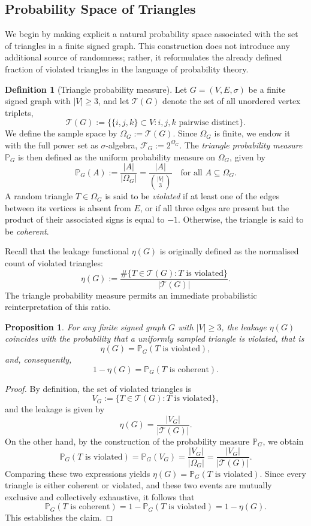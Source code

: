 \documentclass[11pt,a4paper]{article}
\newtheorem{proposition}[theorem]{Proposition}
\theoremstyle{definition}
\newtheorem{definition}[theorem]{Definition}
\newcommand{\Ttri}{\mathcal{T}} %
\newcommand{\Prob}{\mathbb{P}}
\begin{document}
\subsection{Probability Space of Triangles}

We begin by making explicit a natural probability space associated with the set of triangles in a finite signed graph. This construction does not introduce any additional source of randomness; rather, it reformulates the already defined fraction of violated triangles in the language of probability theory.

\begin{definition}[Triangle probability measure]
Let \(G = (V,E,\sigma)\) be a finite signed graph with \(|V| \geq 3\), and let \(\Ttri(G)\) denote the set of all unordered vertex triplets,
\[
 \Ttri(G) := \{ \{i,j,k\} \subset V : i,j,k \text{ pairwise distinct} \}.
\]
We define the sample space by \(\Omega_G := \Ttri(G)\). Since \(\Omega_G\) is finite, we endow it with the full power set as \(\sigma\)-algebra, \(\mathscr{F}_G := 2^{\Omega_G}\). The \emph{triangle probability measure} \(\Prob_G\) is then defined as the uniform probability measure on \(\Omega_G\), given by
\[
 \Prob_G(A) := \frac{|A|}{|\Omega_G|} = \frac{|A|}{\binom{|V|}{3}} \quad \text{for all } A \subseteq \Omega_G.
\]
A random triangle \(T \in \Omega_G\) is said to be \emph{violated} if at least one of the edges between its vertices is absent from \(E\), or if all three edges are present but the product of their associated signs is equal to \(-1\). Otherwise, the triangle is said to be \emph{coherent}.
\end{definition}

Recall that the leakage functional \(\eta(G)\) is originally defined as the normalised count of violated triangles:
\[
 \eta(G) := \frac{\#\{ T \in \Ttri(G) : T \text{ is violated}\}}{|\Ttri(G)|}.
\]
The triangle probability measure permits an immediate probabilistic reinterpretation of this ratio.

\begin{proposition}
For any finite signed graph \(G\) with \(|V| \geq 3\), the leakage \(\eta(G)\) coincides with the probability that a uniformly sampled triangle is violated, that is
\[
 \eta(G) = \Prob_G(T \text{ is violated}),
\]
and, consequently,
\[
 1 - \eta(G) = \Prob_G(T \text{ is coherent}).
\]
\end{proposition}

\begin{proof}
By definition, the set of violated triangles is
\[
 V_G := \{ T \in \Ttri(G) : T \text{ is violated} \},
\]
and the leakage is given by
\[
 \eta(G) = \frac{|V_G|}{|\Ttri(G)|}.
\]
On the other hand, by the construction of the probability measure \(\Prob_G\), we obtain
\[
 \Prob_G(T \text{ is violated}) = \Prob_G(V_G) = \frac{|V_G|}{|\Omega_G|} = \frac{|V_G|}{|\Ttri(G)|}.
\]
Comparing these two expressions yields \(\eta(G) = \Prob_G(T \text{ is violated})\). Since every triangle is either coherent or violated, and these two events are mutually exclusive and collectively exhaustive, it follows that
\[
\Prob_G(T \text{ is coherent}) = 1 - \Prob_G(T \text{ is violated}) = 1 - \eta(G).
\]
This establishes the claim.
\end{proof}
\end{document}
